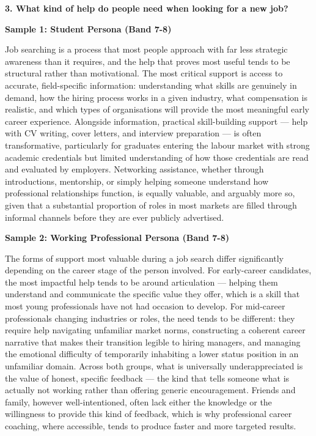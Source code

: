 \separator

\begin{ieltsquestion}
\textbf{3. What kind of help do people need when looking for a new job?}
\end{ieltsquestion}
\textbf{Sample 1: Student Persona (Band 7-8)}

Job searching is a process that most people approach with far less strategic awareness than it requires, and the help that proves most useful tends to be structural rather than motivational. The most critical support is access to accurate, field-specific information: understanding what skills are genuinely in demand, how the hiring process works in a given industry, what compensation is realistic, and which types of organisations will provide the most meaningful early career experience. Alongside information, practical skill-building support — help with CV writing, cover letters, and interview preparation — is often transformative, particularly for graduates entering the labour market with strong academic credentials but limited understanding of how those credentials are read and evaluated by employers. Networking assistance, whether through introductions, mentorship, or simply helping someone understand how professional relationships function, is equally valuable, and arguably more so, given that a substantial proportion of roles in most markets are filled through informal channels before they are ever publicly advertised.

\textbf{Sample 2: Working Professional Persona (Band 7-8)}

The forms of support most valuable during a job search differ significantly depending on the career stage of the person involved. For early-career candidates, the most impactful help tends to be around articulation — helping them understand and communicate the specific value they offer, which is a skill that most young professionals have not had occasion to develop. For mid-career professionals changing industries or roles, the need tends to be different: they require help navigating unfamiliar market norms, constructing a coherent career narrative that makes their transition legible to hiring managers, and managing the emotional difficulty of temporarily inhabiting a lower status position in an unfamiliar domain. Across both groups, what is universally underappreciated is the value of honest, specific feedback — the kind that tells someone what is actually not working rather than offering generic encouragement. Friends and family, however well-intentioned, often lack either the knowledge or the willingness to provide this kind of feedback, which is why professional career coaching, where accessible, tends to produce faster and more targeted results.

